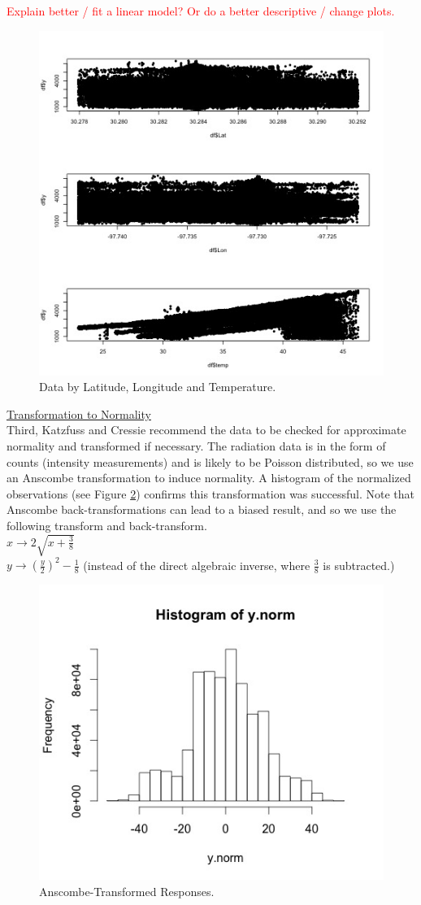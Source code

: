 \documentclass[11pt]{article}
\newcommand{\myindent}{\hspace*{1cm}}
\begin{document}
\textcolor{red}{Explain better / fit a linear model? Or do a better descriptive / change plots.}

\begin{figure}[H]
\centering
\includegraphics[width=0.45\columnwidth]{Images/detrending_plots.jpg}
\caption{Data by Latitude, Longitude and Temperature.}
\label{fig:2}
\end{figure}

\underline{Transformation to Normality}\\
Third, Katzfuss and Cressie recommend the data to be checked for approximate normality and transformed if necessary.  The radiation data is in the form of counts (intensity measurements) and is likely to be Poisson distributed, so we use an Anscombe transformation to induce normality.  A histogram of the normalized observations (see Figure \ref{fig:3}) confirms this transformation was successful.  Note that Anscombe back-transformations can lead to a biased result, and so we use the following transform and back-transform. \\

\myindent $x \rightarrow 2\sqrt{x + \frac{3}{8}}$\\
\myindent $y \rightarrow \left(\frac{y}{2}\right)^2 - \frac{1}{8}$ 
\myindent (instead of the direct algebraic inverse, where $\frac{3}{8}$ is subtracted.)

\begin{figure}[H]
\centering
\includegraphics[width=0.5\columnwidth]{Images/histogram_ynorm}
\caption{Anscombe-Transformed Responses.}
\label{fig:3}
\end{figure}
\end{document}
